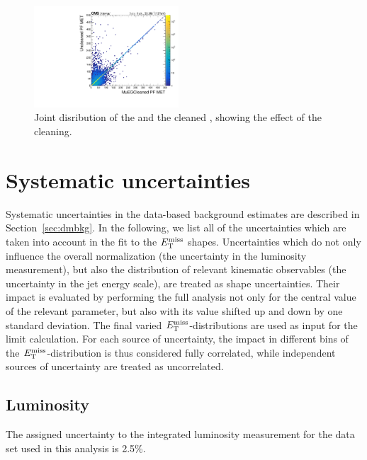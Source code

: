 \begin{figure}[hbtp]
  \centering
  \includegraphics[width=0.48\textwidth]{figures/ll_metAltVsUncleaned.pdf}
  \caption{
    Joint disribution of the \met and the cleaned \met, showing the effect of the cleaning.
  }
  \label{fig:met_control2}
\end{figure}

\section{Systematic uncertainties}
\label{sec:dmsyst}
Systematic uncertainties in the data-based background estimates are described 
in Section~\ref{sec:dmbkg}.
In the following, we list all of the uncertainties which are taken into
account in the fit to the $E_\mathrm{T}^{\mathrm{miss}}$ shapes. 
Uncertainties which do not only influence the overall normalization
(\eg the uncertainty in the luminosity measurement), but also the
distribution of relevant kinematic observables (\eg the uncertainty in
the jet energy scale), are treated as shape uncertainties. Their
impact is evaluated by performing the full analysis not only for the
central value of the relevant parameter, but also with its value
shifted up and down by one standard deviation. The final varied
$E_\mathrm{T}^{\mathrm{miss}}$-distributions are used as input for the limit calculation. For
each source of uncertainty, the impact in different bins of the
$E_\mathrm{T}^{\mathrm{miss}}$-distribution is thus considered fully correlated, while
independent sources of uncertainty are treated as uncorrelated. 

\subsection{Luminosity}

The assigned uncertainty to the integrated luminosity measurement for
the data set used in this analysis is 2.5\%.

